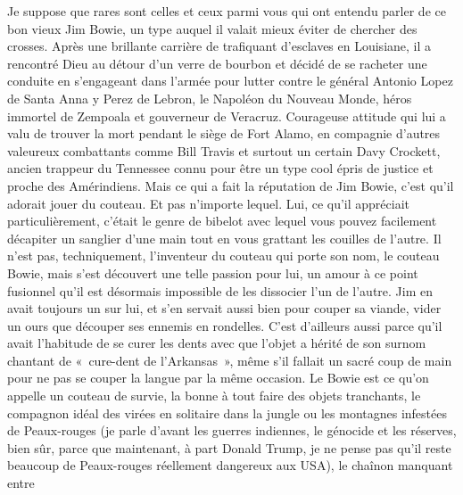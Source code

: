 %
Je suppose que rares sont celles et ceux parmi vous qui ont entendu parler de ce bon vieux Jim Bowie, un type auquel il valait mieux éviter de chercher des crosses. Après une brillante carrière de trafiquant d’esclaves en Louisiane, il a rencontré Dieu au détour d’un verre de bourbon et décidé de se racheter une conduite en s’engageant dans l’armée pour lutter contre le général Antonio Lopez de Santa Anna y Perez de Lebron, le Napoléon du Nouveau Monde, héros immortel de Zempoala et gouverneur de Veracruz. Courageuse attitude qui lui a valu de trouver la mort pendant le siège de Fort Alamo, en compagnie d’autres valeureux combattants comme Bill Travis et surtout un certain Davy Crockett, ancien trappeur du Tennessee connu pour être un type cool épris de justice et proche des Amérindiens. Mais ce qui a fait la réputation de Jim Bowie, c’est qu’il adorait jouer du couteau. Et pas n’importe lequel. Lui, ce qu’il appréciait particulièrement, c’était le genre de bibelot avec lequel vous pouvez facilement décapiter un sanglier d’une main tout en vous grattant les couilles de l’autre. Il n’est pas, techniquement, l’inventeur du couteau qui porte son nom, le couteau Bowie, mais s’est découvert une telle passion pour lui, un amour à ce point fusionnel qu’il est désormais impossible de les dissocier l’un de l’autre. Jim en avait toujours un sur lui, et s’en servait aussi bien pour couper sa viande, vider un ours que découper ses ennemis en rondelles. C’est d’ailleurs aussi parce qu’il avait l’habitude de se curer les dents avec que l’objet a hérité de son surnom chantant de «~cure-dent de l’Arkansas~», même s’il fallait un sacré coup de main pour ne pas se couper la langue par la même occasion. Le Bowie est ce qu’on appelle un couteau de survie, la bonne à tout faire des objets tranchants, le compagnon idéal des virées en solitaire dans la jungle ou les montagnes infestées de Peaux-rouges (je parle d’avant les guerres indiennes, le génocide et les réserves, bien sûr, parce que maintenant, à part Donald Trump, je ne pense pas qu’il reste beaucoup de Peaux-rouges réellement dangereux aux USA), le chaînon manquant entre 